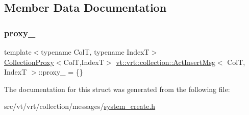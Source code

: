\subsection{Member Data Documentation}
\mbox{\label{structvt_1_1vrt_1_1collection_1_1_act_insert_msg_a2be9c49b1ec5c2706be27f75d8b3a168}} 
\subsubsection{\texorpdfstring{proxy\+\_\+}{proxy\_}}
{\footnotesize\ttfamily template$<$typename ColT, typename IndexT$>$ \\
\hyperlink{structvt_1_1vrt_1_1collection_1_1_collection_proxy}{Collection\+Proxy}$<$ColT,IndexT$>$ \hyperlink{structvt_1_1vrt_1_1collection_1_1_act_insert_msg}{vt\+::vrt\+::collection\+::\+Act\+Insert\+Msg}$<$ ColT, IndexT $>$\+::proxy\+\_\+ = \{\}}



The documentation for this struct was generated from the following file\+:\begin{DoxyCompactItemize}
\item 
src/vt/vrt/collection/messages/\hyperlink{system__create_8h}{system\+\_\+create.\+h}\end{DoxyCompactItemize}
